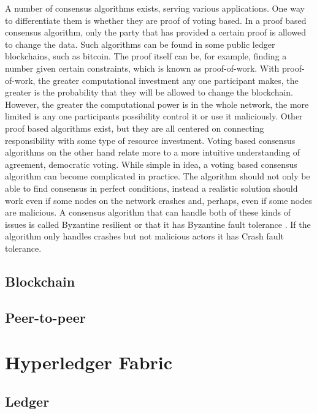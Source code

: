 \documentclass[english, biblatex, digitaloutput]{kththesis}
\begin{document}
A number of consensus algorithms exists, serving various applications. One way to differentiate them is whether they are proof of voting based. In a proof based consensus algorithm, only the party that has provided a certain proof is allowed to change the data. Such algorithms can be found in some public ledger blockchains, such as bitcoin. The proof itself can be, for example, finding a number given certain constraints, which is known as proof-of-work. With proof-of-work, the greater computational investment any one participant makes, the greater is the probability that they will be allowed to change the blockchain. However, the greater the computational power is in the whole network, the more limited is any one participants possibility control it or use it maliciously. Other proof based algorithms exist, but they are all centered on connecting responsibility with some type of resource investment. Voting based consensus algorithms on the other hand relate more to a more intuitive understanding of agreement, \ie democratic voting. While simple in idea, a voting based consensus algorithm can become complicated in practice. The algorithm should not only be able to find consensus in perfect conditions, instead a realistic solution should work even if some nodes on the network crashes and, perhaps, even if some nodes are malicious. A consensus algorithm that can handle both of these kinds of issues is called Byzantine resilient \cite{goos_consensus_1983} or that it has Byzantine fault tolerance \cite{nguyen_survey_2018}. If the algorithm only handles crashes but not malicious actors it has Crash fault tolerance. 


\subsection{Blockchain}



\subsection{Peer-to-peer}




\section{Hyperledger Fabric}

\subsection{Ledger}
\end{document}
